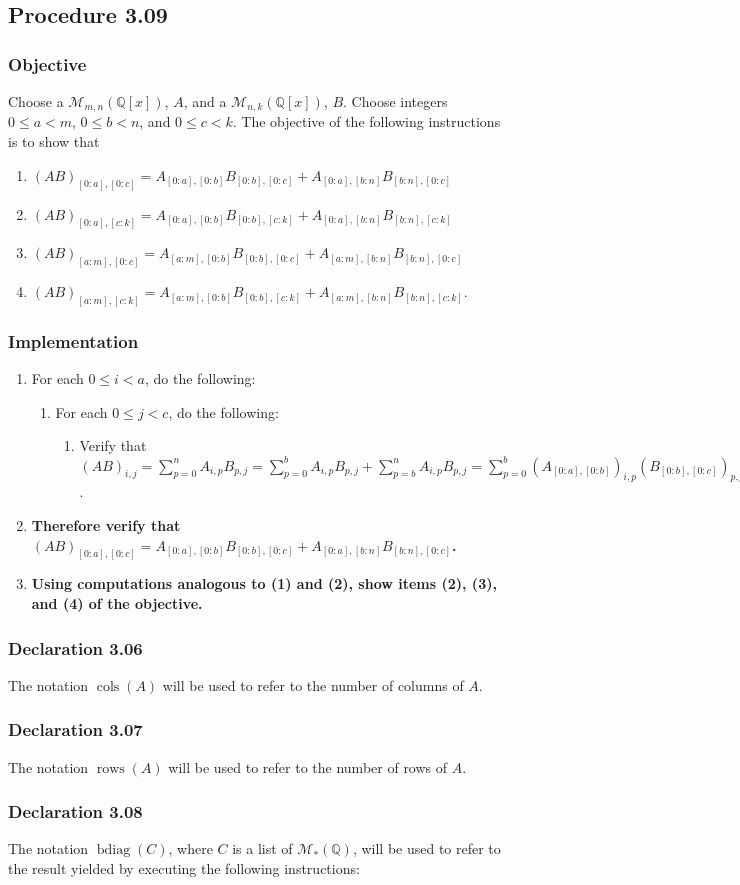 \documentclass[twocolumn]{article}
\DeclareMathOperator{\bdiag}{bdiag}
\DeclareMathOperator{\cols}{cols}
\DeclareMathOperator{\rows}{rows}
\newcommand{\declaration}[1]{\subsubsection*{Declaration #1}\label{sec:declaration #1}}
\newcommand{\procedure}[2][]{\subsection*{Procedure #2 \ifthenelse{\equal{#1}{}}{}{(#1)}}\label{sec:procedure #2}}
\newcommand{\objective}{\subsubsection*{Objective}}
\newcommand{\implementation}{\subsubsection*{Implementation}}
\begin{document}
		\procedure{3.09}
			\objective
				Choose a $\mathcal{M}_{m,n}(\mathbb{Q}[x])$, $A$, and a $\mathcal{M}_{n,k}(\mathbb{Q}[x])$, $B$. Choose integers $0\le a<m$, $0\le b<n$, and $0\le c<k$. The objective of the following instructions is to show that
				\begin{enumerate}
					\item $(AB)_{[0:a],[0:c]}=A_{[0:a],[0:b]}B_{[0:b],[0:c]}+A_{[0:a],[b:n]}B_{[b:n],[0:c]}$
					\item $(AB)_{[0:a],[c:k]}=A_{[0:a],[0:b]}B_{[0:b],[c:k]}+A_{[0:a],[b:n]}B_{[b:n],[c:k]}$
					\item $(AB)_{[a:m],[0:c]}=A_{[a:m],[0:b]}B_{[0:b],[0:c]}+A_{[a:m],[b:n]}B_{[b:n],[0:c]}$
					\item $(AB)_{[a:m],[c:k]}=A_{[a:m],[0:b]}B_{[0:b],[c:k]}+A_{[a:m],[b:n]}B_{[b:n],[c:k]}$.
				\end{enumerate}
			\implementation
				\begin{enumerate}
					\item For each $0\le i<a$, do the following:
					\begin{enumerate}
						\item For each $0\le j<c$, do the following:
							\begin{enumerate}
								\item Verify that $(AB)_{i,j}=\sum_{p=0}^n A_{i,p}B_{p,j}=\sum_{p=0}^{b} A_{i,p}B_{p,j}+\sum_{p=b}^n A_{i,p}B_{p,j}=\sum_{p=0}^{b} (A_{[0:a],[0:b]})_{i,p}(B_{[0:b],[0:c]})_{p,j}+\sum_{p=0}^{n-b} (A_{[0:a],[b:n]})_{i,p}(B_{[b:n],[0:c]})_{p,j}=(A_{[0:a],[0:b]}B_{[0:b],[0:c]})_{i,j}+(A_{[0:a],[b:n]}B_{[b:n],[0:c]})_{i,j}$.
							\end{enumerate}
					\end{enumerate}
					\item \textbf{Therefore verify that $(AB)_{[0:a],[0:c]}=A_{[0:a],[0:b]}B_{[0:b],[0:c]}+A_{[0:a],[b:n]}B_{[b:n],[0:c]}$.}
					\item \textbf{Using computations analogous to (1) and (2), show items (2), (3), and (4) of the objective.}
				\end{enumerate}
		\declaration{3.06}
			The notation $\cols(A)$ will be used to refer to the number of columns of $A$.
		\declaration{3.07}
			The notation $\rows(A)$ will be used to refer to the number of rows of $A$.
		\declaration{3.08}
			The notation $\bdiag(C)$, where $C$ is a list of $\mathcal{M}_{*}(\mathbb{Q})$, will be used to refer to the result yielded by executing the following instructions:
\end{document}
